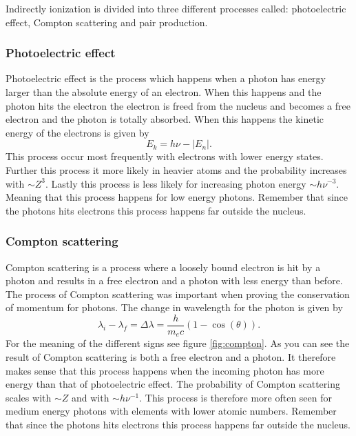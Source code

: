 \documentclass[jmp, amsmath, amssymb, reprint]{article}
\numberwithin{equation}{section}
\newcommand{\lp}{\left(}
\newcommand{\rp}{\right)}
\begin{document}
\begin{multicols}{2}
Indirectly ionization is divided into three different processes called: photoelectric effect, Compton scattering and pair production.

\subsubsection{Photoelectric effect}

Photoelectric effect is the process which happens when a photon has energy larger than the absolute energy of an electron. When this happens and the photon hits the electron the electron is freed from the nucleus and becomes a free electron and the photon is totally absorbed. When this happens the kinetic energy of the electrons is given by
\begin{equation}
E_k =h\nu-|E_n|.
\end{equation}
This process occur most frequently with electrons with lower energy states. Further this process it more likely in heavier atoms and the probability increases with \(\sim Z^3\). Lastly this process is less likely for increasing photon energy \(\sim h\nu^{-3}\). Meaning that this process happens for low energy photons. Remember that since the photons hits electrons this process happens far outside the nucleus.

\subsubsection{Compton scattering}

Compton scattering is a process where a loosely bound electron is hit by a photon and results in a free electron and a photon with less energy than before. The process of Compton scattering was important when proving the conservation of momentum for photons. The change in wavelength for the photon is given by
\begin{equation}
\lambda_i-\lambda_f=\Delta\lambda=\frac{h}{m_ec}\lp 1-\cos\lp\theta\rp\rp.
\end{equation}
For the meaning of the different signs see figure \ref{fig:compton}. As you can see the result of Compton scattering is both a free electron and a photon. It therefore makes sense that this process happens when the incoming photon has more energy than that of photoelectric effect. The probability of Compton scattering scales with \(\sim Z\) and with \(\sim h\nu^{-1}\). This process is therefore more often seen for medium energy photons with elements with lower atomic numbers. Remember that since the photons hits electrons this process happens far outside the nucleus.


\end{multicols}
\end{document}
